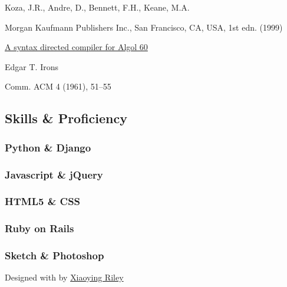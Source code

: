 \documentclass[english,]{article}
\begin{document}
Koza, J.R., Andre, D., Bennett, F.H., Keane, M.A.

Morgan Kaufmann Publishers Inc., San Francisco, CA, USA, 1st edn. (1999)

\protect\hyperlink{}{A syntax directed compiler for Algol 60}

Edgar T. Irons

Comm. ACM 4 (1961), 51--55

\hypertarget{skills-proficiency}{%
\subsection{\texorpdfstring{{ \emph{} \emph{} } Skills \&
Proficiency}{    Skills \& Proficiency}}\label{skills-proficiency}}

\hypertarget{python-django}{%
\subsubsection{Python \& Django}\label{python-django}}

\hypertarget{javascript-jquery}{%
\subsubsection{Javascript \& jQuery}\label{javascript-jquery}}

\hypertarget{html5-css}{%
\subsubsection{HTML5 \& CSS}\label{html5-css}}

\hypertarget{ruby-on-rails}{%
\subsubsection{Ruby on Rails}\label{ruby-on-rails}}

\hypertarget{sketch-photoshop}{%
\subsubsection{Sketch \& Photoshop}\label{sketch-photoshop}}

{Designed with \emph{} by \href{http://themes.3rdwavemedia.com}{Xiaoying
Riley}}
\end{document}
